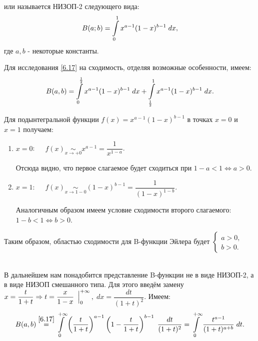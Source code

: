 \begin{col-answer-preambule}
\end{col-answer-preambule}


 или  называется НИЗОП-2 следующего вида:
\begin{equation}
    \label{6.17}
    B(a; b) = \displaystyle\int\limits_0^1 x^{a-1} (1-x)^{b-1} \; dx,
\end{equation}
где $ a, b $ - некоторые константы.

$  $\\

Для исследования \eqref{6.17} на сходимость, отделяя возможные особенности, имеем:
\begin{equation*}
    B(a, b) = \displaystyle\int\limits_0^\frac{1}{2} x^{a-1} (1-x)^{b-1} \; dx + \displaystyle\int\limits_\frac{1}{2}^1 x^{a-1} (1-x)^{b-1} \; dx.
\end{equation*}

Для подынтегральной функции $ f(x) = x^{a-1} (1-x)^{b-1} $ в точках $ x=0 $ и $ x=1 $ получаем:
\begin{enumerate}
    \item $ x=0 $: $\;\;\;$ $ f(x) \underset{x \to +0}{\sim} x^{a-1} = \dfrac{1}{x^{1-a}}$.

    Отсюда видно, что первое слагаемое будет сходиться при $ 1-a < 1 \Leftrightarrow a > 0$.

    \item $ x=1 $: $\;\;\;$ $ f(x) \underset{x \to 1-0}{\sim} (1-x)^{b-1} = \dfrac{1}{(1-x)^{1-b}}$.

    Аналогичным образом имеем условие сходимости второго слагаемого:
    ${ 1-b < 1 \Leftrightarrow b > 0 }$.
\end{enumerate}

Таким образом, областью сходимости для B-функции Эйлера будет
$ \begin{cases}
    a > 0,\\
    b > 0.
\end{cases} $

$  $\\\\

В дальнейшем нам понадобится представление B-функции не в виде НИЗОП-2, а в виде НИЗОП смешанного типа.
Для этого введём замену
$ x = \dfrac{t}{1+t} \Rightarrow t = \dfrac{x}{1-x} \left.\dfrac{ }{}\right\vert_0^{+\infty}, $ \linebreak
$ dx = \dfrac{dt}{(1+t)^2} $. Имеем:
\begin{equation}
    \label{6.18}
    B(a,b) \overset{\eqref{6.17}}{=}
    \displaystyle\int\limits_0^{+\infty} \left(\dfrac{t}{1+t}\right)^{a-1} \left(1-\dfrac{t}{1+t}\right)^{b-1} \; \dfrac{dt}{(1+t)^2} =
    \displaystyle\int\limits_0^{+\infty} \dfrac{t^{a-1}}{(1+t)^{a+b}} \; dt.
\end{equation}

